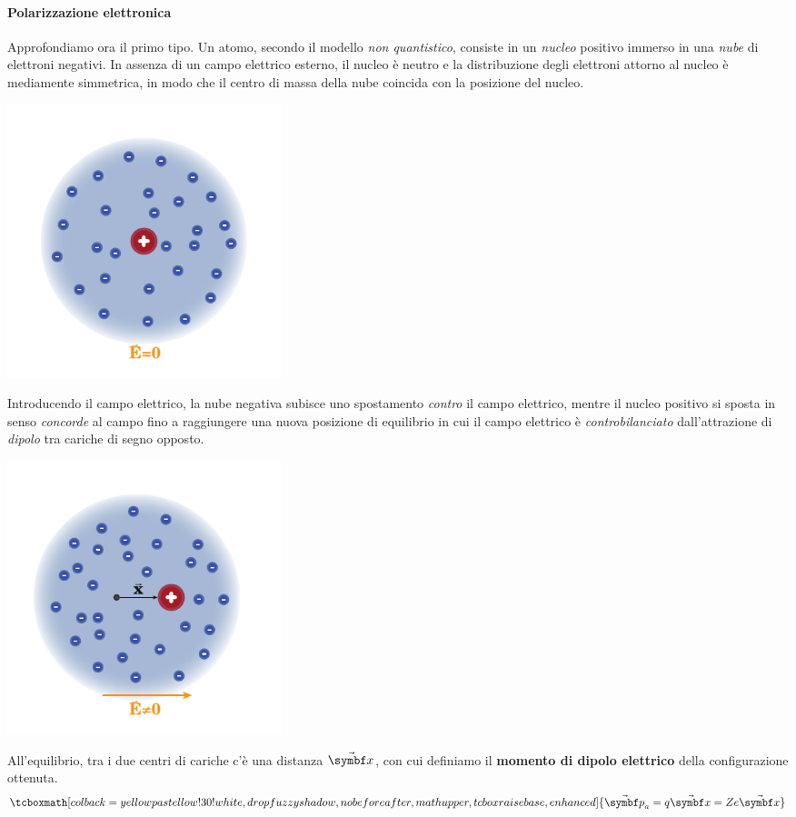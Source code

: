\paragraph{Polarizzazione elettronica}
Approfondiamo ora il primo tipo. Un atomo, secondo il modello \textit{non quantistico}, consiste in un \textit{nucleo} positivo immerso in una \textit{nube} di elettroni negativi. In assenza di un campo elettrico esterno, il nucleo è neutro e la distribuzione degli elettroni attorno al nucleo è mediamente simmetrica, in modo che il centro di massa della nube coincida con la posizione del nucleo.
\begin{center}
	\includegraphics[width=0.35\textwidth]{images/chp6/chp6polarizzazionenucleo1.pdf}
\end{center}
Introducendo il campo elettrico, la nube negativa subisce uno spostamento \textit{contro} il campo elettrico, mentre il nucleo positivo si sposta in senso \textit{concorde} al campo fino a raggiungere una nuova posizione di equilibrio in cui il campo elettrico è \textit{controbilanciato} dall'attrazione di \textit{dipolo} tra cariche di segno opposto.
\begin{center}
	\includegraphics[width=0.35\textwidth]{images/chp6/chp6polarizzazionenucleo2.pdf}
\end{center}
All'equilibrio, tra i due centri di cariche c'è una distanza $\vba{x}$, con cui definiamo il \textbf{momento di dipolo elettrico} della configurazione ottenuta.
\begin{equation}
	\tcboxmath[colback=yellowpastellow!30!white,drop fuzzy shadow, nobeforeafter, math upper, tcbox raise base, enhanced]{\vba{p}_a=q\vba{x}=Ze\vba{x}}
\end{equation}
